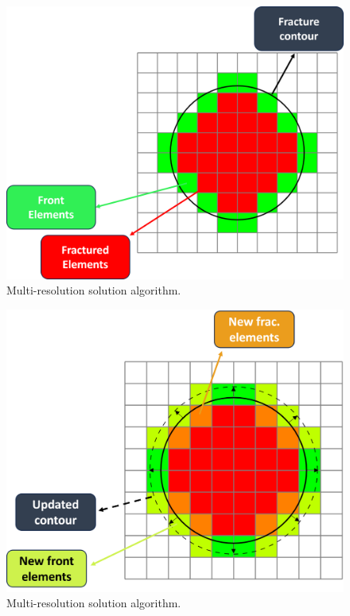 \begin{figure}[h]
    \centering
    \includegraphics[width=\linewidth]{Chapter4/figures/penny_with_descriptions.png}
    \caption{Multi-resolution solution algorithm.}
    \label{fig:lorem4}
\end{figure}

\begin{figure}[h]
    \centering
    \includegraphics[width=\linewidth]{Chapter4/figures/larger_penny_with_descriptions.png}
    \caption{Multi-resolution solution algorithm.}
    \label{fig:lorem2}
\end{figure}

